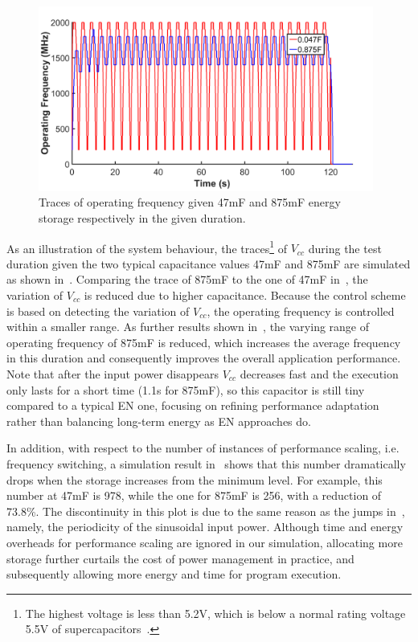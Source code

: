 \begin{figure} [!tb]
    \centering
    \includegraphics[width=11cm]{figure/work2/op}
    \caption{Traces of operating frequency given 47mF and 875mF energy storage respectively in the given duration.}
    \label{Figure:op}
\end{figure} 

As an illustration of the system behaviour, the traces\footnote{The highest voltage is less than 5.2V, which is below a normal rating voltage 5.5V of supercapacitors~\cite{capacitor}.} of $V_{cc}$ during the test duration given the two typical capacitance values 47mF and 875mF are simulated as shown in~. Comparing the trace of 875mF to the one of 47mF in~, the variation of $V_{cc}$ is reduced due to higher capacitance. Because the control scheme is based on detecting the variation of $V_{cc}$, the operating frequency is controlled within a smaller range. As further results shown in~, the varying range of operating frequency of 875mF is reduced, which increases the average frequency in this duration and consequently improves the overall application performance. Note that after the input power disappears $V_{cc}$ decreases fast and the execution only lasts for a short time (1.1s for 875mF), so this capacitor is still tiny compared to a typical EN one, focusing on refining performance adaptation rather than balancing long-term energy as EN approaches do.

In addition, with respect to the number of instances of performance scaling, i.e. frequency switching, a simulation result in~ shows that this number dramatically drops when the storage increases from the minimum level. For example, this number at 47mF is 978, while the one for 875mF is 256, with a reduction of 73.8\%. The discontinuity in this plot is due to the same reason as the jumps in~, namely, the periodicity of the sinusoidal input power. Although time and energy overheads for performance scaling are ignored in our simulation, allocating more storage further curtails the cost of power management in practice, and subsequently allowing more energy and time for program execution.

